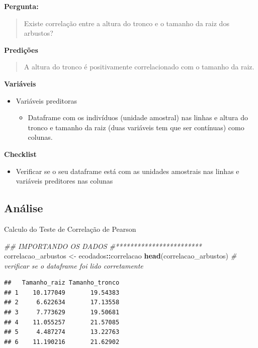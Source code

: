 \documentclass[
]{book}
\newenvironment{Shaded}{\begin{snugshade}}{\end{snugshade}}
\newcommand{\CommentTok}[1]{\textcolor[rgb]{0.56,0.35,0.01}{\textit{#1}}}
\newcommand{\KeywordTok}[1]{\textcolor[rgb]{0.13,0.29,0.53}{\textbf{#1}}}
\newcommand{\NormalTok}[1]{#1}
\newcommand{\OperatorTok}[1]{\textcolor[rgb]{0.81,0.36,0.00}{\textbf{#1}}}
\newcommand{\StringTok}[1]{\textcolor[rgb]{0.31,0.60,0.02}{#1}}
\providecommand{\tightlist}{%
  \setlength{\itemsep}{0pt}\setlength{\parskip}{0pt}}
\begin{document}
\textbf{Pergunta:}

\begin{quote}
Existe correlação entre a altura do tronco e o tamanho da raiz dos arbustos?
\end{quote}

\textbf{Predições}

\begin{quote}
A altura do tronco é positivamente correlacionado com o tamanho da raiz.
\end{quote}

\textbf{Variáveis}

\begin{itemize}
\tightlist
\item
  Variáveis preditoras

  \begin{itemize}
  \tightlist
  \item
    Dataframe com os indivíduos (unidade amostral) nas linhas e altura do tronco e tamanho da raiz (duas variáveis tem que ser contínuas) como colunas.
  \end{itemize}
\end{itemize}

\textbf{Checklist}

\begin{itemize}
\tightlist
\item
  Verificar se o seu dataframe está com as unidades amostrais nas linhas e variáveis preditores nas colunas
\end{itemize}

\hypertarget{anuxe1lise-3}{%
\subsection{Análise}\label{anuxe1lise-3}}

Calculo do Teste de Correlação de Pearson

\begin{Shaded}
\begin{Highlighting}[]
\CommentTok{## IMPORTANDO OS DADOS}
\CommentTok{#************************}
\NormalTok{correlacao_arbustos <-}\StringTok{ }\NormalTok{ecodados}\OperatorTok{::}\NormalTok{correlacao}
\KeywordTok{head}\NormalTok{(correlacao_arbustos) }\CommentTok{# verificar se o dataframe foi lido corretamente}
\end{Highlighting}
\end{Shaded}

\begin{verbatim}
##   Tamanho_raiz Tamanho_tronco
## 1    10.177049       19.54383
## 2     6.622634       17.13558
## 3     7.773629       19.50681
## 4    11.055257       21.57085
## 5     4.487274       13.22763
## 6    11.190216       21.62902
\end{verbatim}
\end{document}
